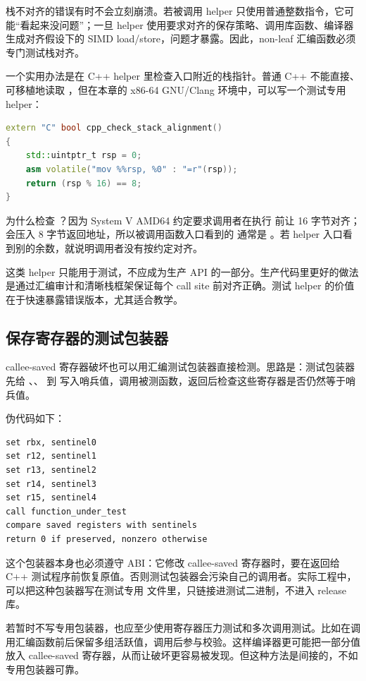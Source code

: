 栈不对齐的错误有时不会立刻崩溃。若被调用 helper 只使用普通整数指令，它可能“看起来没问题”；一旦 helper 使用要求对齐的保存策略、调用库函数、编译器生成对齐假设下的 SIMD load/store，问题才暴露。因此，non-leaf 汇编函数必须专门测试栈对齐。

一个实用办法是在 C++ helper 里检查入口附近的栈指针。普通 C++ 不能直接、可移植地读取 ，但在本章的 x86-64 GNU/Clang 环境中，可以写一个测试专用 helper：

\begin{lstlisting}[language=C++]
extern "C" bool cpp_check_stack_alignment()
{
    std::uintptr_t rsp = 0;
    asm volatile("mov %%rsp, %0" : "=r"(rsp));
    return (rsp % 16) == 8;
}
\end{lstlisting}

为什么检查 ？因为 System V AMD64 约定要求调用者在执行  前让  16 字节对齐； 会压入 8 字节返回地址，所以被调用函数入口看到的  通常是 。若 helper 入口看到别的余数，就说明调用者没有按约定对齐。

这类 helper 只能用于测试，不应成为生产 API 的一部分。生产代码里更好的做法是通过汇编审计和清晰栈框架保证每个 call site 前对齐正确。测试 helper 的价值在于快速暴露错误版本，尤其适合教学。

\subsection{保存寄存器的测试包装器}

callee-saved 寄存器破坏也可以用汇编测试包装器直接检测。思路是：测试包装器先给 、、 到  写入哨兵值，调用被测函数，返回后检查这些寄存器是否仍然等于哨兵值。

伪代码如下：

\begin{lstlisting}
set rbx, sentinel0
set r12, sentinel1
set r13, sentinel2
set r14, sentinel3
set r15, sentinel4
call function_under_test
compare saved registers with sentinels
return 0 if preserved, nonzero otherwise
\end{lstlisting}

这个包装器本身也必须遵守 ABI：它修改 callee-saved 寄存器时，要在返回给 C++ 测试程序前恢复原值。否则测试包装器会污染自己的调用者。实际工程中，可以把这种包装器写在测试专用  文件里，只链接进测试二进制，不进入 release 库。

若暂时不写专用包装器，也应至少使用寄存器压力测试和多次调用测试。比如在调用汇编函数前后保留多组活跃值，调用后参与校验。这样编译器更可能把一部分值放入 callee-saved 寄存器，从而让破坏更容易被发现。但这种方法是间接的，不如专用包装器可靠。

